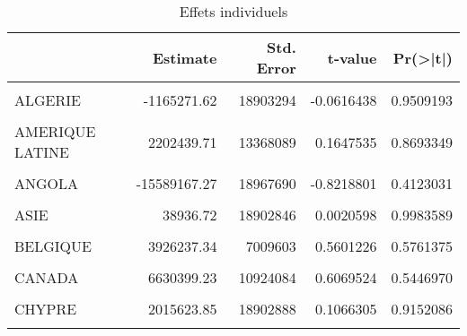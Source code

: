 \documentclass[
]{book}
\begin{document}
\begin{table}

\caption{\label{tab:unnamed-chunk-50}Effets individuels }
\centering
\begin{tabular}[t]{l|r|r|r|r}
\hline
  & Estimate & Std. Error & t-value & Pr(>|t|)\\
\hline
\cellcolor{gray!6}{AFRIQUE DU SUD} & \cellcolor{gray!6}{-2984326.03} & \cellcolor{gray!6}{8460861} & \cellcolor{gray!6}{-0.3527213} & \cellcolor{gray!6}{0.7247369}\\
\hline
ALGERIE & -1165271.62 & 18903294 & -0.0616438 & 0.9509193\\
\hline
\cellcolor{gray!6}{ALLEMAGNE} & \cellcolor{gray!6}{-1632580.61} & \cellcolor{gray!6}{7723181} & \cellcolor{gray!6}{-0.2113871} & \cellcolor{gray!6}{0.8328399}\\
\hline
AMERIQUE LATINE & 2202439.71 & 13368089 & 0.1647535 & 0.8693349\\
\hline
\cellcolor{gray!6}{GRANDE BRATAGNE} & \cellcolor{gray!6}{-3470934.54} & \cellcolor{gray!6}{6056452} & \cellcolor{gray!6}{-0.5730970} & \cellcolor{gray!6}{0.5673408}\\
\hline
ANGOLA & -15589167.27 & 18967690 & -0.8218801 & 0.4123031\\
\hline
\cellcolor{gray!6}{ARABIE} & \cellcolor{gray!6}{-142028.25} & \cellcolor{gray!6}{18902837} & \cellcolor{gray!6}{-0.0075136} & \cellcolor{gray!6}{0.9940139}\\
\hline
ASIE & 38936.72 & 18902846 & 0.0020598 & 0.9983589\\
\hline
\cellcolor{gray!6}{AUSTRALIE} & \cellcolor{gray!6}{285990.29} & \cellcolor{gray!6}{18902686} & \cellcolor{gray!6}{0.0151296} & \cellcolor{gray!6}{0.9879466}\\
\hline
BELGIQUE & 3926237.34 & 7009603 & 0.5601226 & 0.5761375\\
\hline
\cellcolor{gray!6}{BURUNDI} & \cellcolor{gray!6}{-315018.56} & \cellcolor{gray!6}{6301266} & \cellcolor{gray!6}{-0.0499929} & \cellcolor{gray!6}{0.9601871}\\
\hline
CANADA & 6630399.23 & 10924084 & 0.6069524 & 0.5446970\\
\hline
\cellcolor{gray!6}{CHINE} & \cellcolor{gray!6}{21758300.68} & \cellcolor{gray!6}{6513971} & \cellcolor{gray!6}{3.3402513} & \cellcolor{gray!6}{0.0010301}\\
\hline
CHYPRE & 2015623.85 & 18902888 & 0.1066305 & 0.9152086\\
\hline
\cellcolor{gray!6}{CONGO BRAZA} & \cellcolor{gray!6}{355028.22} & \cellcolor{gray!6}{18902684} & \cellcolor{gray!6}{0.0187819} & \cellcolor{gray!6}{0.9850373}\\

\end{tabular}
\end{table}
\end{document}

